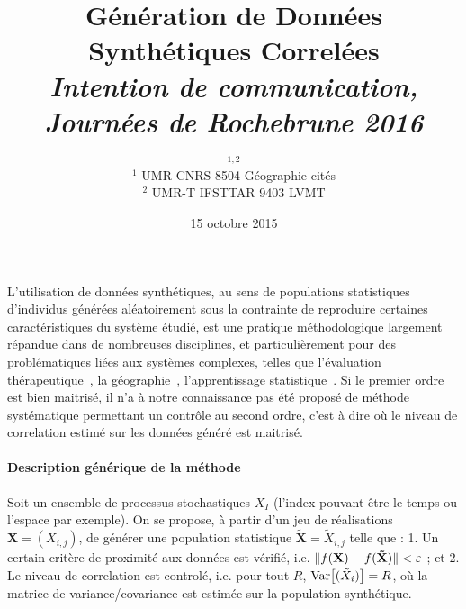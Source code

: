 


\title{\vspace{-1.5cm}Génération de Données Synthétiques Correlées\\\medskip
\textit{Intention de communication, Journées de Rochebrune 2016}
}
\author{$^{1,2}$\\
$^{1}$ UMR CNRS 8504 Géographie-cités\\
$^{2}$ UMR-T IFSTTAR 9403 LVMT
}
\date{15 octobre 2015}


\maketitle

\justify

\vspace{-0.5cm}

L'utilisation de données synthétiques, au sens de populations statistiques d'individus générées aléatoirement sous la contrainte de reproduire certaines caractéristiques du système étudié, est une pratique méthodologique largement répandue dans de nombreuses disciplines, et particulièrement pour des problématiques liées aux systèmes complexes, telles que l'évaluation thérapeutique~\cite{abadie2010synthetic}, la géographie~\cite{moeckel2003creating}, l'apprentissage statistique~\cite{bolon2013review}. Si le premier ordre est bien maitrisé, il n'a à notre connaissance pas été proposé de méthode systématique permettant un contrôle au second ordre, c'est à dire où le niveau de correlation estimé sur les données généré est maitrisé.

\vspace{-0.4cm}
\paragraph{Description générique de la méthode}

Soit un ensemble de processus stochastiques $X_I$ (l'index pouvant être le temps ou l'espace par exemple). On se propose, à partir d'un jeu de réalisations $\mathbf{X}=(X_{i,j})$, de générer une population statistique $\mathbf{\tilde{X}}=\tilde{X}_{i,j}$ telle que : 1. Un certain critère de proximité aux données est vérifié, i.e. $\| f(\mathbf{X})-f(\mathbf{\tilde{X}}) \| < \varepsilon$ ; et 2. Le niveau de correlation est controlé, i.e. pour tout $R$, $\operatorname{Var}\!\left[(\tilde{X}_i)\right] = R$, où la matrice de variance/covariance est estimée sur la population synthétique.


\vspace{-0.4cm}
